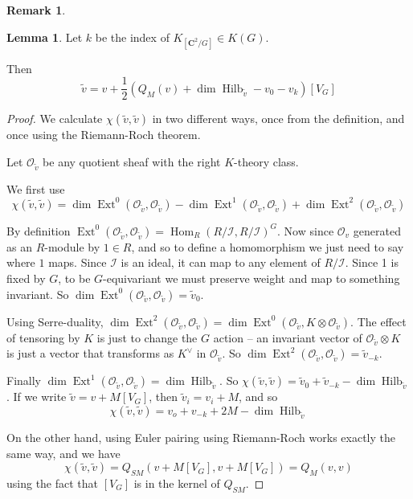 \documentclass{amsart}[12pt]
\theoremstyle{definition}
\newtheorem{lemma}[dummy]{Lemma}
\newtheorem{remark}[dummy]{Remark}
\newcommand{\C}{\mathbf{C}}
\newcommand{\OO}{\mathcal{O}}
\newcommand{\II}{\mathcal{I}}
\DeclareMathOperator{\Hilb}{Hilb}
\DeclareMathOperator{\Ext}{Ext}
\DeclareMathOperator{\Hom}{Hom}
\begin{document}
\begin{remark}
\begin{lemma}
Let $k$ be the index of $K_{[\C^2/G]}\in K(G)$.

Then
$$\tilde{v}=v+\frac{1}{2}\left(Q_M(v)+\dim\Hilb_{\tilde{v}} -v_0-v_{k}\right)[V_G]$$
\end{lemma}



\begin{proof}
We calculate $\chi(\tilde{v},\tilde{v})$ in two different ways, once from the definition, and once using the Riemann-Roch theorem.

Let $\OO_{\tilde{v}}$ be any quotient sheaf with the right $K$-theory class.  

We first use
$$\chi(\tilde{v}, \tilde{v})=\dim\Ext^0(\OO_{\tilde{v}},\OO_{\tilde{v}})-\dim\Ext^1(\OO_{\tilde{v}},\OO_{\tilde{v}})+\dim\Ext^2(\OO_{\tilde{v}},\OO_{\tilde{v}})$$

By definition $\Ext^0(\OO_{\tilde{v}},\OO_{\tilde{v}})=\Hom_R(R/\II,R/\II)^G$.  Now since $\OO_v$ generated as an $R$-module by $1\in R$, and so to define a homomorphism we just need to say where $1$ maps. Since $\II$ is an ideal, it can map to any element of $R/\II$.  Since 1 is fixed by $G$, to be $G$-equivariant we must preserve weight and map to something invariant.  So $\dim\Ext^0(\OO_{\tilde{v}},\OO_{\tilde{v}})=\tilde{v}_0$.  

Using Serre-duality, $\dim\Ext^2(\OO_{\tilde{v}},\OO_{\tilde{v}})=\dim\Ext^0(\OO_{\tilde{v}},K\otimes\OO_{\tilde{v}})$.  The effect of tensoring by $K$ is just to change the $G$ action -- an invariant vector of $\OO_{\tilde{v}}\otimes K$ is just a vector that transforms as $K^\vee$ in $\OO_{\tilde{v}}$.  
So $\dim\Ext^2(\OO_{\tilde{v}},\OO_{\tilde{v}})=\tilde{v}_{-k}$.  

Finally $\dim\Ext^1(\OO_{\tilde{v}},\OO_{\tilde{v}})=\dim\Hilb_{\tilde{v}}$.  So $\chi(\tilde{v},\tilde{v})=\tilde{v}_0+\tilde{v}_{-k}-\dim\Hilb_{\tilde{v}}$.  If we write $\tilde{v}=v+M [V_G]$, then $\tilde{v}_i=v_i+M$, and so  
\begin{equation} \label{eq:EXT-evaluation}
\chi(\tilde{v},\tilde{v})=v_o+v_{-k}+2M-\dim\Hilb_{\tilde{v}} 
\end{equation}

On the other hand, using Euler pairing using Riemann-Roch works exactly the same way, and we have
\begin{equation} \label{eq:RR-evaluation}
\chi(\tilde{v},\tilde{v})=Q_{SM}(v+M[V_G],v+M[V_G])=Q_M(v,v)
\end{equation}
using the fact that $[V_G]$ is in the kernel of $Q_{SM}$.  


\end{proof}
\end{remark}
\end{document}

